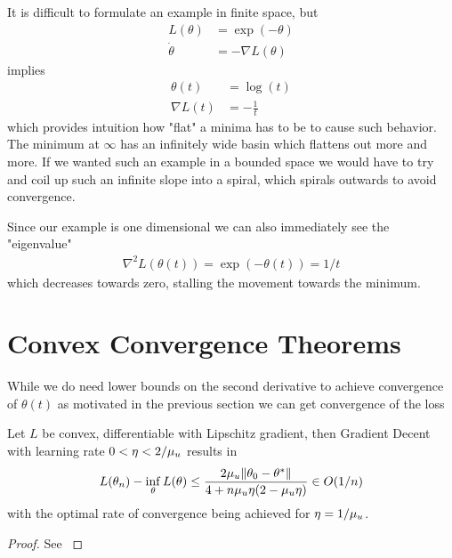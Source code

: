 It is difficult to formulate an example in finite space, but
%
\begin{align*}
	L(\theta) &= \exp(-\theta) \\
	\dot{\theta} &= -\nabla L(\theta)
\end{align*}
%
implies
%
\begin{align*}
	\theta(t) &= \log(t)\\
	\nabla L(t) &= -\tfrac1t
\end{align*}
%
which provides intuition how "flat" a minima has to be to cause such behavior.
The minimum at \(\infty\) has an infinitely wide basin which flattens out
more and more. If we wanted such an example in a bounded space we would have
to try and coil up such an infinite slope into a spiral, which spirals outwards
to avoid convergence.

Since our example is one dimensional we can also immediately see the "eigenvalue"
%
\begin{align*}
	\nabla^2 L(\theta(t)) = \exp(-\theta(t)) = 1/t
\end{align*}
%
which decreases towards zero, stalling the movement towards the minimum.

\section{Convex Convergence Theorems}

While we do need lower bounds on the second derivative to achieve convergence
of \(\theta(t)\) as motivated in the previous section we can get convergence
of the loss

\begin{theorem}
	Let \(L\) be convex, differentiable with Lipschitz gradient, then Gradient
	Decent with learning rate \(0 < \eta < 2/\mu_u\) results in
	\begin{align*}
		L(\theta_n) - \inf_\theta L(\theta)
		\le \frac{2\mu_u\|\theta_0 - \theta^*\|}{4 + n\mu_u\eta(2-\mu_u\eta)}
		\in O(1/n)
	\end{align*}
	with the optimal rate of convergence being achieved for \(\eta=1/\mu_u\).
\end{theorem}
\begin{proof}
	See \textcite[Theorem 2.1.14, Corollary
	2.1.2]{nesterovLecturesConvexOptimization2018}
\end{proof}

